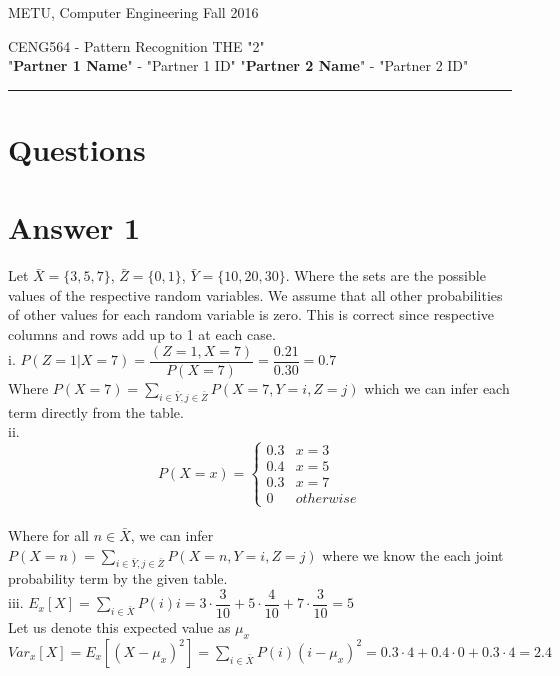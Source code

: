 \documentclass[12pt]{article}
\newcommand{\myheader}[4]
{\vspace*{-0.5in}
\noindent
{#1} \hfill {#3}

\noindent
{#2} \hfill {#4}

\noindent
\rule[8pt]{\textwidth}{1pt}

\vspace{1ex} 
}  %
\newcommand{\myalgsheader}[0]
{\myheader{METU, Computer Engineering}
{CENG564 - Pattern Recognition THE "2" \\ "{\bf Partner 1 Name}"  - "Partner 1 ID" "{\bf Partner 2 Name}"  - "Partner 2 ID"} {Fall 2016}{}}
\begin{document}
\myalgsheader
{}
\pagestyle{plain}



\section*{Questions} 

\section*{Answer 1}

Let $\bar{X} = \{3,5,7\}$, $\bar{Z} = \{0,1\}$, $\bar{Y} = \{10,20,30\}$. Where the sets are the possible values of the respective random variables. We assume that all other probabilities of other values for each random variable is zero. This is correct since respective columns and rows add up to 1 at each case.\\

i. $P(Z=1 | X=7) =  \dfrac{(Z=1, X=7)}{P(X=7)} = \dfrac{0.21}{0.30}=0.7$ \\ Where $P(X=7) = \sum_{i\in \bar{Y},j\in \bar{Z}  } P(X=7,Y=i,Z=j)$ which we can infer each term directly from the table.\\

ii. 
\[ P(X=x) = \begin{cases} 
      0.3 & x = 3 \\
      0.4 & x=5 \\
      0.3 & x=7 \\
      0 & otherwise 
   \end{cases}
\] \\

    Where for all $n \in \bar{X}$, we can infer $P(X=n) = \sum_{i\in \bar{Y},j\in \bar{Z}  } P(X=n,Y=i,Z=j)$ where we know the each joint probability term by the given table.\\
    
        iii. 
    $E_x[X] = \sum_{i\in\bar{X}} P(i)i = 3 \cdot \dfrac{3}{10}+ 5\cdot \dfrac{4}{10}+ 7\cdot \dfrac{3}{10} = 5 $ \\
    
    Let us denote this expected value as $\mu_x$ \\
    
    $Var_x[X] = E_x[ (X - \mu_x)^2 ] = \sum_{i\in\bar{X}} P( i )(i-\mu_x)^2 = 0.3\cdot 4 + 0.4\cdot 0 + 0.3 \cdot 4 = 2.4$ \\
    
\end{document}
